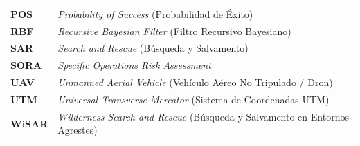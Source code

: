 \documentclass[12pt]{report} %
\begin{document}
\begin{table}[H]
\begin{tabular}{ll}
\textbf{POS} & \textit{Probability of Success} (Probabilidad de Éxito) \\
\textbf{RBF} & \textit{Recursive Bayesian Filter} (Filtro Recursivo Bayesiano) \\
\textbf{SAR} & \textit{Search and Rescue} (Búsqueda y Salvamento) \\
\textbf{SORA} & \textit{Specific Operations Risk Assessment} \\
\textbf{UAV} & \textit{Unmanned Aerial Vehicle} (Vehículo Aéreo No Tripulado / Dron) \\
\textbf{UTM} & \textit{Universal Transverse Mercator} (Sistema de Coordenadas UTM) \\
\textbf{WiSAR} & \textit{Wilderness Search and Rescue} (Búsqueda y Salvamento en Entornos Agrestes) \\
\end{tabular}
\end{table}

\newpage %
\thispagestyle{empty}
\mbox{}


\clearpage
{} %












\clearpage
{}
\printbibliography




\clearpage
{}
{}

\end{document}
